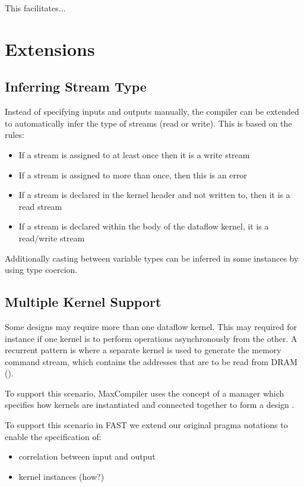 This facilitates...

\section{Extensions}

\label{sec:fast-extensions}

\subsection{Inferring Stream Type}

Instead of specifying inputs and outputs manually, the \fastc{}
compiler can be extended to automatically infer the type of streams
(read or write). This is based on the rules:
\begin{itemize}
\item If a stream is assigned to at least once then it is a write stream
\item If a stream is assigned to more than once, then this is an error
\item If a stream is declared in the kernel header and not written
  to, then it is a read stream
\item If a stream is declared within the body of the dataflow
  kernel, it is a read/write stream
\end{itemize}

Additionally casting between variable types can be inferred in some
instances by using type coercion.


\subsection{Multiple Kernel Support}

Some designs may require more than one dataflow kernel. This may
required for instance if one kernel is to perform operations
asynchronously from the other. A recurrent pattern is where a separate
kernel is used to generate the memory command stream, which contains
the addresses that are to be read from DRAM ().

To support this scenario, MaxCompiler uses the concept of a manager
which specifies how kernels are instantiated and connected together to
form a design .

To support this scenario in FAST we extend our original pragma
notations to enable the specification of:
\begin{itemize}
\item correlation between input and output
\item kernel instances (how?)
\end{itemize}

